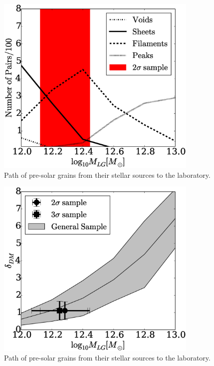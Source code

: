 \documentclass{iau}
\begin{document}
\begin{figure}[b]
\begin{center}
 \includegraphics[width=3.8in]{histogram_mass_distro.eps} 
 \caption{Path of pre-solar grains from their stellar sources to the laboratory.}
   \label{fig1}
\end{center}
\end{figure}

\begin{figure}[b]
\begin{center}
 \includegraphics[width=3.8in]{median_mass_overdensity.eps} 
 \caption{Path of pre-solar grains from their stellar sources to the laboratory.}
   \label{fig1}
\end{center}
\end{figure}
\end{document}
